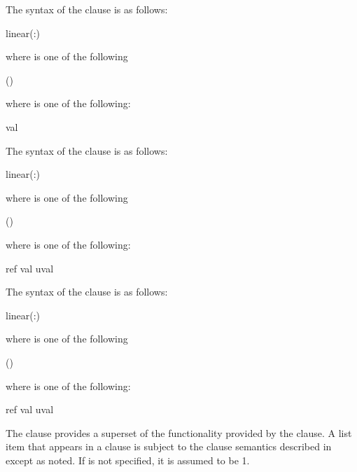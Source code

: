 \begin{cspecific}
The syntax of the  clause is as follows:
\begin{ompSyntax}
linear(\plc{linear-list[ }:\plc{ linear-step]})
\end{ompSyntax}
where  is one of the following
% 
\begin{indentedcodelist}
()
\end{indentedcodelist}
where   is one of the following:
% 
\begin{indentedcodelist}
val
\end{indentedcodelist}
\end{cspecific}
%
\begin{cppspecific}
The syntax of the  clause is as follows:
\begin{ompSyntax}
linear(\plc{linear-list[ }:\plc{ linear-step]})
\end{ompSyntax}
where  is one of the following
% 
\begin{indentedcodelist}
()
\end{indentedcodelist}
where   is one of the following:
% 
\begin{indentedcodelist}
ref
val
uval
\end{indentedcodelist}
\end{cppspecific}

\begin{fortranspecific}
The syntax of the  clause is as follows:
\begin{ompSyntax}
linear(\plc{linear-list[ }:\plc{ linear-step]})
\end{ompSyntax}
where  is one of the following
% 
\begin{indentedcodelist}
()
\end{indentedcodelist}
where   is one of the following:
% 
\begin{indentedcodelist}
ref
val
uval
\end{indentedcodelist}
\end{fortranspecific}


\descr
The  clause provides a superset of the functionality provided by the  clause.
A list item that appears in a  clause is subject to the  clause semantics described
in  except as noted.
If  is not specified, it is assumed to be 1.

